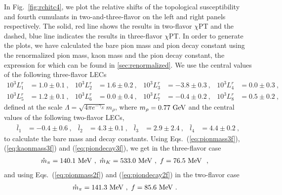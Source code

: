 \documentclass[12pt]{elsarticle}
\begin{document}
In Fig.~\ref{fig:rchitc4}, we plot the relative shifts of the topological susceptibility and fourth cumulants in two-and-three-flavor on the left and right panels respectively. The solid, red line shows the results in two-flavor $\chi$PT and the dashed, blue line indicates the results in three-flavor $\chi$PT. In order to generate the plots, we have calculated the bare pion mass and pion decay constant using the renormalized pion mass, kaon mass and the pion decay constant, the expression for which can be found in \ref{sec:renormalized}. We use the central values of the following three-flavor LECs
\begin{align}
10^{3}{L}_{1}^r&=1.0\pm 0.1\ ,&
10^{3}{L}_{2}^r&=1.6\pm 0.2\ ,& 10^{3}{L}_{3}^r&=-3.8\pm 0.3\ ,&
10^{3}{L}_{4}^r&=0.0 \pm 0.3\ ,\\
10^{3}{L}_{5}^r&=1.2 \pm 0.1\ ,&10^{3}{L}_{6}^r&=0.0 \pm 0.4\ ,& 10^{3}{L}_{7}^r&=-0.4 \pm 0.2\ , & 10^{3}{L}_{8}^r&=0.5 \pm 0.2\ ,
\label{eq:LEC3f}
\end{align}
defined at the scale $\Lambda=\sqrt{4\pi e^{-\gamma_E}}m_{\rho}$, where $m_{\rho}=0.77\ {\rm GeV}$ and the central values of the following two-flavor LECs,
\begin{align}
\label{eq:LEC2f}
\bar{l}_{1}&=-0.4\pm0.6\ ,&\bar{l}_{2}&=4.3\pm0.1\ ,&\bar{l}_{3}&=2.9\pm2.4\ ,&\bar{l}_{4}&=4.4\pm0.2\ ,
\end{align}
to calculate the bare mass and decay constants. Using Eqs.~(\ref{eq:pionmass3f}),(\ref{eq:kaonmass3f}) and (\ref{eq:piondecay3f}), we get in the three-flavor case
\begin{align}
\mathring{m}_{\pi}&=140.1\ {\rm MeV}\ ,\ \mathring{m}_{K}=533.0\ {\rm MeV}\ ,\ f=76.5\ {\rm MeV}\ \ ,
\end{align}
and using  Eqs.~(\ref{eq:pionmass2f}) and (\ref{eq:piondecay2f}) in the two-flavor case
\begin{align}
\mathring{m}_{\pi}&=141.3\ {\rm MeV}\ ,\  f=85.6\ {\rm MeV}\ .
\end{align}
\end{document}
